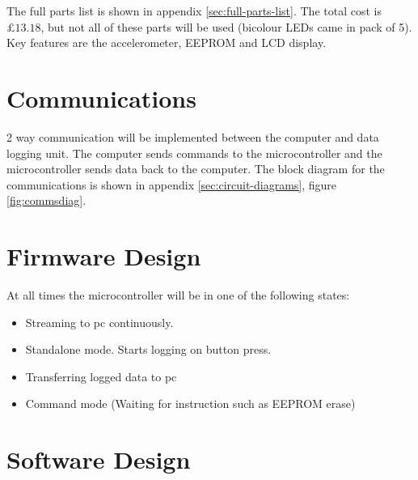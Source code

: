 \documentclass[a4paper,11pt]{article}  %
\begin{document}
The full parts list is shown in appendix
\ref{sec:full-parts-list}. The total cost is $\pounds 13.18$, but not
all of these parts will be used (bicolour LEDs came in pack of 5). Key
features are the accelerometer, EEPROM and LCD display.

\section{Communications}
\label{sec:communications}

2 way communication will be implemented between the computer and data
logging unit. The computer sends commands to the microcontroller and
the microcontroller sends data back to the computer. The block diagram
for the communications is shown in appendix
\ref{sec:circuit-diagrams}, figure \ref{fig:commsdiag}.


\section{Firmware Design}
\label{sec:firmware-design}

At all times the microcontroller will be in one of the following
states:

\begin{itemize}
  \item Streaming to pc continuously.
  \item Standalone mode. Starts logging on button press.
  \item Transferring logged data to pc
  \item Command mode (Waiting for instruction such as EEPROM erase)
\end{itemize}

\section{Software Design}
\label{sec:software-design}
\end{document}
